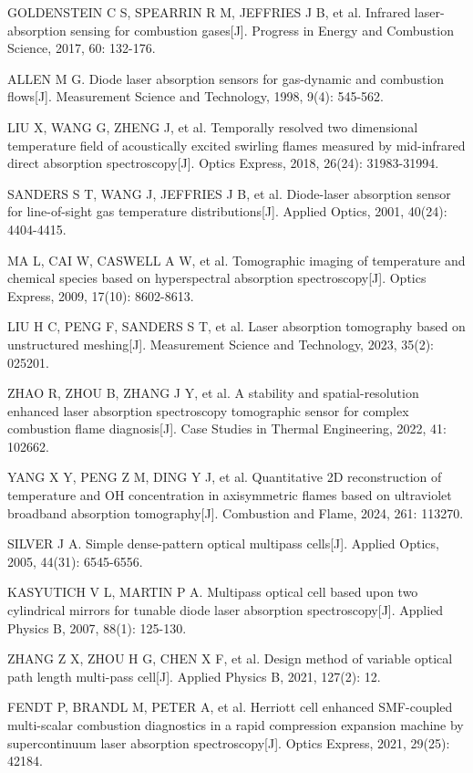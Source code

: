 \documentclass[UTF8,a4paper,zihao=-4,fontset=windows]{ctexart}
\begin{document}
{\begin{enumerate}[label={[\arabic*]}, leftmargin=2.2em,
  labelsep=0.2em, itemsep=0pt, parsep=0pt, topsep=2pt, partopsep=0pt]
\item GOLDENSTEIN C S, SPEARRIN R M, JEFFRIES J B, et al. Infrared laser-absorption sensing for combustion gases[J]. Progress in Energy and Combustion Science, 2017, 60: 132-176.
\item ALLEN M G. Diode laser absorption sensors for gas-dynamic and combustion flows[J]. Measurement Science and Technology, 1998, 9(4): 545-562.
\item LIU X, WANG G, ZHENG J, et al. Temporally resolved two dimensional temperature field of acoustically excited swirling flames measured by mid-infrared direct absorption spectroscopy[J]. Optics Express, 2018, 26(24): 31983-31994.
\item SANDERS S T, WANG J, JEFFRIES J B, et al. Diode-laser absorption sensor for line-of-sight gas temperature distributions[J]. Applied Optics, 2001, 40(24): 4404-4415.
\item MA L, CAI W, CASWELL A W, et al. Tomographic imaging of temperature and chemical species based on hyperspectral absorption spectroscopy[J]. Optics Express, 2009, 17(10): 8602-8613.
\item LIU H C, PENG F, SANDERS S T, et al. Laser absorption tomography based on unstructured meshing[J]. Measurement Science and Technology, 2023, 35(2): 025201.
\item ZHAO R, ZHOU B, ZHANG J Y, et al. A stability and spatial-resolution enhanced laser absorption spectroscopy tomographic sensor for complex combustion flame diagnosis[J]. Case Studies in Thermal Engineering, 2022, 41: 102662.
\item YANG X Y, PENG Z M, DING Y J, et al. Quantitative 2D reconstruction of temperature and OH concentration in axisymmetric flames based on ultraviolet broadband absorption tomography[J]. Combustion and Flame, 2024, 261: 113270.
\item SILVER J A. Simple dense-pattern optical multipass cells[J]. Applied Optics, 2005, 44(31): 6545-6556.
\item KASYUTICH V L, MARTIN P A. Multipass optical cell based upon two cylindrical mirrors for tunable diode laser absorption spectroscopy[J]. Applied Physics B, 2007, 88(1): 125-130.
\item ZHANG Z X, ZHOU H G, CHEN X F, et al. Design method of variable optical path length multi-pass cell[J]. Applied Physics B, 2021, 127(2): 12.
\item FENDT P, BRANDL M, PETER A, et al. Herriott cell enhanced SMF-coupled multi-scalar combustion diagnostics in a rapid compression expansion machine by supercontinuum laser absorption spectroscopy[J]. Optics Express, 2021, 29(25): 42184.

\end{enumerate}}
\end{document}
